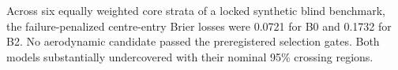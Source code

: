 Across six equally weighted core strata of a locked synthetic blind benchmark, the failure-penalized centre-entry Brier losses were 0.0721 for B0 and 0.1732 for B2. No aerodynamic candidate passed the preregistered selection gates. Both models substantially undercovered with their nominal 95\% crossing regions.
